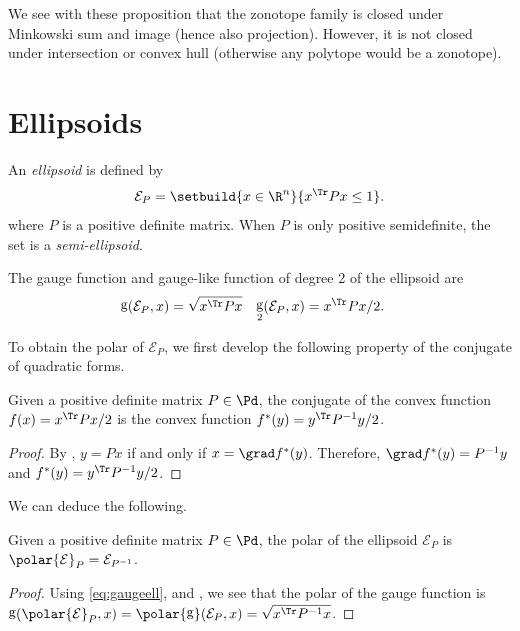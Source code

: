 \documentclass[11pt,twoside,a4paper,openright]{uclouvain-thesis}
\DeclareMathOperator{\gauge}{g}
\begin{document}
We see with these proposition that the zonotope family is closed under
Minkowski sum and image (hence also projection).
However, it is not closed under intersection or convex hull (otherwise any polytope would be a zonotope).



\section{Ellipsoids}
\label{sec:ell}

An \emph{ellipsoid} is defined by
\begin{equation}
  \label{eq:ell}
  \mathcal{E}_P = \setbuild{x \in \R^n}{x^\Tr P x \leq 1}.
\end{equation}
where $P$ is a positive definite matrix.
When $P$ is only positive semidefinite, the set is a \emph{semi-ellipsoid}.

The gauge function and gauge-like function of degree 2 of the ellipsoid are
\begin{align}
  \label{eq:gaugeell}
  \gauge(\mathcal{E}_P, x) & = \sqrt{x^\Tr P x} &
  \gauge_2(\mathcal{E}_P, x) & = x^\Tr P x / 2.
\end{align}

To obtain the polar of $\mathcal{E}_P$, we first develop the following
property of the conjugate of quadratic forms.
\begin{myprop}
  \label{prop:conjquad}
  Given a positive definite matrix $P \in \Pd$, the conjugate of the convex function
  $f(x) = x^\Tr P x / 2$ is the convex function $f^*(y) = y^\Tr P^{-1} y / 2$.
  \begin{proof}
    By , $y = Px$ if and only if $x = \grad f^*(y)$.
    Therefore, $\grad f^*(y) = P^{-1}y$ and $f^*(y) = y^\Tr P^{-1} y / 2$.
  \end{proof}
\end{myprop}

We can deduce the following.
\begin{myprop}
  \label{prop:polarell}
  Given a positive definite matrix $P \in \Pd$, the polar of the ellipsoid $\mathcal{E}_P$
  is $\polar{\mathcal{E}}_P = \mathcal{E}_{P^{-1}}$.
  \begin{proof}
    Using \eqref{eq:gaugeell},  and ,
    we see that the polar of the gauge function is
    $\gauge(\polar{\mathcal{E}}_P, x) = \polar{\gauge}(\mathcal{E}_P, x) = \sqrt{x^\Tr P^{-1} x}$.
  \end{proof}
\end{myprop}
\end{document}

